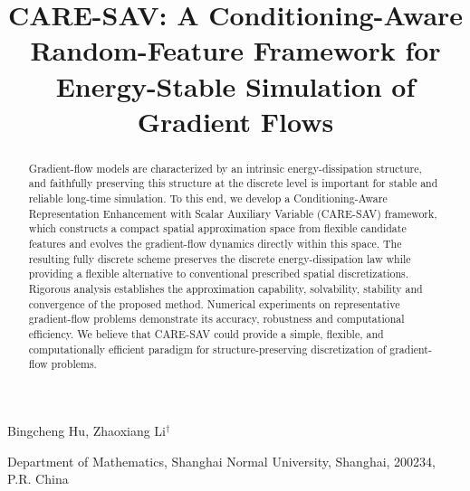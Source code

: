 \documentclass[10pt,reqno]{amsart}
\title[CARE-SAV for Gradient Flows]{CARE-SAV: A Conditioning-Aware Random-Feature Framework for Energy-Stable Simulation of Gradient Flows}
\author[B. Hu and Z. Li]{}
\theoremstyle{remark}
\theoremstyle{definition}
\begin{document}
 \maketitle
\centerline{Bingcheng Hu, Zhaoxiang Li$^\dag$}
\centerline{Department of  Mathematics, Shanghai Normal University, Shanghai,
200234, P.R. China}


%

\begin{abstract}
Gradient-flow models are characterized by an intrinsic energy-dissipation structure, and faithfully preserving this structure at the discrete level is important for stable and reliable long-time simulation. To this end, we develop a Conditioning-Aware Representation Enhancement with Scalar Auxiliary Variable (CARE-SAV) framework, which constructs a compact spatial approximation space from flexible candidate features and evolves the gradient-flow dynamics directly within this space. The resulting fully discrete scheme preserves the discrete energy-dissipation law while providing a flexible alternative to conventional prescribed spatial discretizations. Rigorous analysis establishes the approximation capability, solvability, stability and convergence of the proposed method. Numerical experiments on representative gradient-flow problems demonstrate its accuracy, robustness and computational efficiency. We believe that CARE-SAV could provide a simple, flexible, and computationally efficient paradigm for structure-preserving discretization of gradient-flow problems.
\end{abstract}

\end{document}

